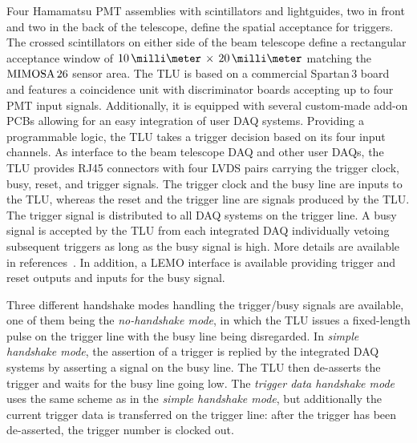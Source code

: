 Four Hamamatsu PMT assemblies with scintillators and lightguides, two in front and two in the back of the telescope, define the spatial acceptance for triggers. 
The crossed scintillators on either side of the beam telescope define a rectangular acceptance window of $10\,\milli\meter\,\times\,20\,\milli\meter$ matching the $\textrm{MIMOSA\,26}$ sensor area. 
The TLU is based on a commercial Spartan\,3 board and features a coincidence unit with discriminator boards accepting up to four PMT input signals. 
Additionally, it is equipped with several custom-made add-on PCBs allowing for an easy integration of user DAQ systems. 
Providing a programmable logic, the TLU  takes a trigger decision based on its four input channels. 
As interface to the beam telescope DAQ and other user DAQs, the TLU provides RJ45 connectors with four LVDS pairs carrying the trigger clock, busy, reset, and trigger signals. 
The trigger clock and the busy line are inputs to the TLU, whereas the reset and the trigger line are signals produced by the TLU. 
The trigger signal is distributed to all DAQ systems on the trigger line. 
A busy signal is accepted by the TLU from each integrated DAQ individually vetoing subsequent triggers as long as the busy signal is high. 
More details are available in references~\cite{EUDET-2009-04,ref:TLUproc}.
In addition, a LEMO interface is available providing trigger and reset outputs and inputs for the busy signal.

Three different handshake modes handling the trigger/busy signals are available, one of them being the \textit{no-handshake mode},
 in which the TLU issues a fixed-length pulse on the trigger line with the busy line being disregarded. 
In \textit{simple handshake mode}, the assertion of a trigger is replied by the integrated DAQ systems by asserting a signal on the busy line. 
The TLU then de-asserts the trigger and waits for the busy line going low.
The \textit{trigger data handshake mode} uses the same scheme as in the \textit{simple handshake mode}, but additionally the current trigger data is transferred on the trigger line:
after the trigger has been de-asserted, the trigger number is clocked out. 
%


